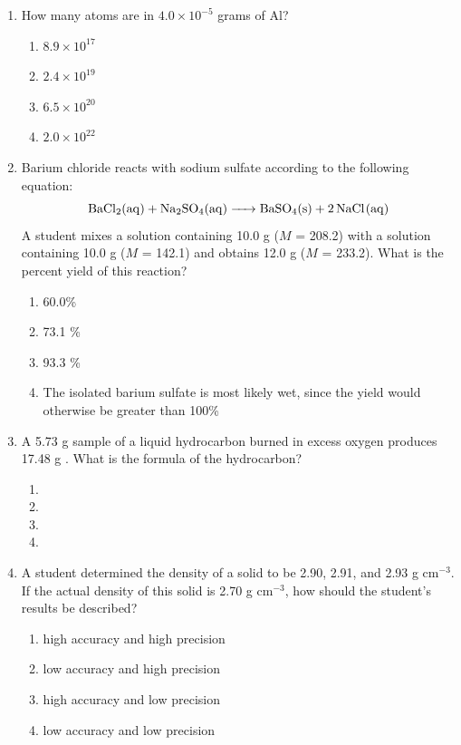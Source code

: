 \documentclass[11pt, leqno]{article}
\begin{document}
\newpage
\begin{enumerate}[leftmargin = *]
\item How many atoms are in $4.0 \times 10^{-5}$ grams of Al?
\begin{enumerate}
    \item $8.9 \times 10^{17}$
    \item $2.4 \times 10^{19}$
    \item $6.5 \times 10^{20}$
    \item $2.0 \times 10^{22}$
\end{enumerate}

\item Barium chloride reacts with sodium sulfate according to the following equation:
    $$\ce{BaCl2(aq) + Na2SO4(aq) -> BaSO4(s) + 2NaCl(aq)}$$
A student mixes a solution containing 10.0 g  ($M$ = 208.2) with a solution containing 10.0 g  ($M$ = 142.1) and obtains 12.0 g  ($M$ = 233.2). What is the percent yield of this reaction?
\begin{enumerate}
\item 60.0\%
\item 73.1 \%
\item 93.3 \%
\item The isolated barium sulfate is most likely wet, since the yield would otherwise be greater than 100\%
\end{enumerate}
\item A 5.73 g sample of a liquid hydrocarbon burned in excess oxygen produces 17.48 g . What is the formula of the hydrocarbon?
\begin{enumerate}
    \item {}
    \item {}
    \item {}
    \item {}
\end{enumerate}
\item A student determined the density of a solid to be 2.90, 2.91, and 2.93 g cm$^{-3}$. If the actual density of this solid is 2.70 g cm$^{-3}$, how should the student's results be described?
\begin{enumerate}
    \item high accuracy and high precision
    \item low accuracy and high precision
    \item high accuracy and low precision
    \item low accuracy and low precision

\end{enumerate}
\end{enumerate}
\end{document}
